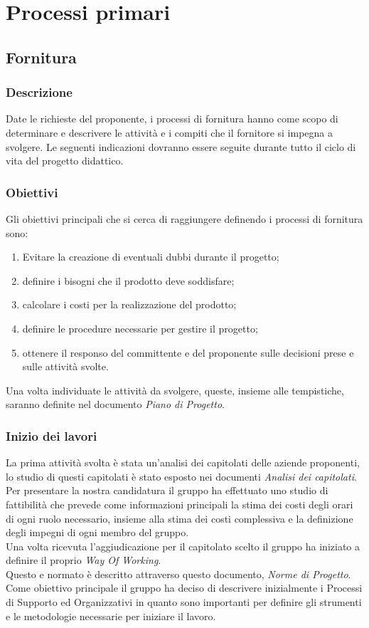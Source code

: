 \section{Processi primari} 

\subsection{Fornitura} 
\subsubsection{Descrizione}
Date le richieste del proponente, i processi di fornitura hanno come scopo di determinare e descrivere le attività e i compiti che il fornitore si impegna a svolgere.
Le seguenti indicazioni dovranno essere seguite durante tutto il ciclo di vita del progetto didattico.

\subsubsection{Obiettivi} 
Gli obiettivi principali che si cerca di raggiungere definendo i processi di fornitura sono: 
\begin{enumerate}
    \item Evitare la creazione di eventuali dubbi durante il progetto; 
    \item definire i bisogni che il prodotto deve soddisfare; 
    \item calcolare i costi per la realizzazione del prodotto; 
    \item definire le procedure necessarie per gestire il progetto; 
    \item ottenere il responso del committente e del proponente sulle decisioni prese e sulle attività svolte.
\end{enumerate}
Una volta individuate le attività da svolgere, queste, insieme alle tempistiche, 
saranno definite nel documento \textit{Piano di Progetto}.


\subsubsection{Inizio dei lavori} 
La prima attività svolta è stata un'analisi dei capitolati delle aziende proponenti, lo studio di questi capitolati è stato esposto nei documenti \textit{Analisi dei capitolati}. \\
Per presentare la nostra candidatura il gruppo ha effettuato uno studio di fattibilità che 
prevede come informazioni principali la stima dei costi degli orari di ogni ruolo necessario, 
insieme alla stima dei costi complessiva e la definizione degli impegni di ogni membro del gruppo. \\
Una volta ricevuta l'aggiudicazione per il capitolato scelto il gruppo ha iniziato a definire il proprio \textit{Way Of Working}. \\
Questo e normato è descritto attraverso questo documento, \textit{Norme di Progetto}. \\
Come obiettivo principale il gruppo ha deciso di descrivere inizialmente i Processi di Supporto ed Organizzativi in quanto sono 
importanti per definire gli strumenti e le metodologie necessarie per iniziare il lavoro. 


